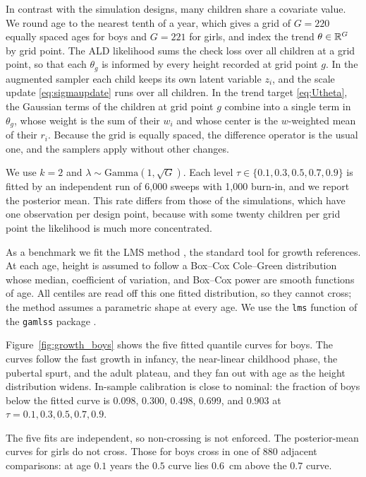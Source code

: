 In contrast with the simulation designs, many children share a covariate value. We round age to the nearest tenth of a year, which gives a grid of $G = 220$ equally spaced ages for boys and $G = 221$ for girls, and index the trend $\theta \in \mathbb{R}^{G}$ by grid point. The ALD likelihood sums the check loss over all children at a grid point, so that each $\theta_g$ is informed by every height recorded at grid point $g$. In the augmented sampler each child keeps its own latent variable $z_i$, and the scale update \eqref{eq:sigmaupdate} runs over all children. In the trend target \eqref{eq:Utheta}, the Gaussian terms of the children at grid point $g$ combine into a single term in $\theta_g$, whose weight is the sum of their $w_i$ and whose center is the $w$-weighted mean of their $r_i$. Because the grid is equally spaced, the difference operator is the usual one, and the samplers apply without other changes.

We use $k = 2$ and $\lambda \sim \mathrm{Gamma}(1, \sqrt{G})$. Each level $\tau \in \{0.1, 0.3, 0.5, 0.7, 0.9\}$ is fitted by an independent run of 6{,}000 sweeps with 1{,}000 burn-in, and we report the posterior mean. This rate differs from those of the simulations, which have one observation per design point, because with some twenty children per grid point the likelihood is much more concentrated.

As a benchmark we fit the LMS method \citep{cole1992smoothing}, the standard tool for growth references. At each age, height is assumed to follow a Box--Cox Cole--Green distribution whose median, coefficient of variation, and Box--Cox power are smooth functions of age. All centiles are read off this one fitted distribution, so they cannot cross; the method assumes a parametric shape at every age. We use the \texttt{lms} function of the \texttt{gamlss} package \citep{rigby2005generalized}.

Figure~\ref{fig:growth_boys} shows the five fitted quantile curves for boys. The curves follow the fast growth in infancy, the near-linear childhood phase, the pubertal spurt, and the adult plateau, and they fan out with age as the height distribution widens. In-sample calibration is close to nominal: the fraction of boys below the fitted curve is $0.098$, $0.300$, $0.498$, $0.699$, and $0.903$ at $\tau = 0.1, 0.3, 0.5, 0.7, 0.9$.

The five fits are independent, so non-crossing is not enforced. The posterior-mean curves for girls do not cross. Those for boys cross in one of $880$ adjacent comparisons: at age $0.1$ years the $0.5$ curve lies $0.6$~cm above the $0.7$ curve.

